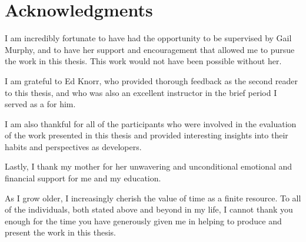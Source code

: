 
\chapter{Acknowledgments}

I am incredibly fortunate to have had the opportunity to be supervised by Gail Murphy,
and to have her support and encouragement that allowed me to pursue the work in this thesis.
This work would not have been possible without her.

I am grateful to Ed Knorr, who provided thorough feedback as the second reader to this thesis,
and who was also an excellent instructor in the brief period I served as a  for him.

I am also thankful for all of the participants who were involved in the evaluation of the work presented in this thesis
and provided interesting insights into their habits and perspectives as developers.

Lastly, I thank my mother for her unwavering and unconditional emotional and financial support for me and my education.

As I grow older, I increasingly cherish the value of time as a finite resource.
To all of the individuals, both stated above and beyond in my life,
I cannot thank you enough for the time you have generously given me in helping to produce and present the work in this thesis.